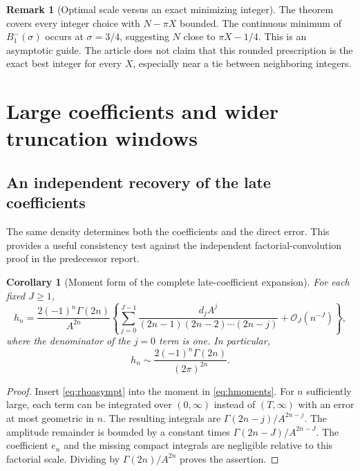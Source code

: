 \documentclass[11pt,a4paper]{article}
\newtheorem{corollary}[corollary]{Corollary}
\theoremstyle{definition}
\newtheorem{remark}[remark]{Remark}
\numberwithin{equation}{section}
\newcommand{\Oh}{\mathcal O}
\begin{document}
\begin{remark}[Optimal scale versus an exact minimizing integer]
The theorem covers every integer choice with $N-\pi X$ bounded. The
continuous minimum of $B_1^-(\sigma)$ occurs at $\sigma=3/4$, suggesting
$N$ close to $\pi X-1/4$. This is an asymptotic guide. The article does
not claim that this rounded prescription is the exact best integer for
every $X$, especially near a tie between neighboring integers.
\end{remark}

\section{Large coefficients and wider truncation windows}
\label{sec:windows}

\subsection{An independent recovery of the late coefficients}
The same density determines both the coefficients and the direct error.
This provides a useful consistency test against the independent
factorial-convolution proof in the predecessor report.

\begin{corollary}[Moment form of the complete late-coefficient expansion]
\label{cor:late}
For each fixed $J\ge1$,
\begin{equation}
 h_n=\frac{2(-1)^n\Gamma(2n)}{A^{2n}}
 \left\{\sum_{j=0}^{J-1}
 \frac{d_jA^j}{(2n-1)(2n-2)\cdots(2n-j)}+\Oh_J(n^{-J})\right\},
 \label{eq:late}
\end{equation}
where the denominator of the $j=0$ term is one. In particular,
\begin{equation}
 h_n\sim\frac{2(-1)^n\Gamma(2n)}{(2\pi)^{2n}}.
 \label{eq:lateleading}
\end{equation}
\end{corollary}
\begin{proof}
Insert \eqref{eq:rhoasympt} into the moment in \eqref{eq:hmoments}.
For $n$ sufficiently large, each term can be integrated over $(0,\infty)$
instead of $(T,\infty)$ with an error at most geometric in $n$.
The resulting integrals are
$\Gamma(2n-j)/A^{2n-j}$. The amplitude remainder is bounded by a constant
times $\Gamma(2n-J)/A^{2n-J}$. The coefficient $e_n$ and the missing
compact integrals are negligible relative to this factorial scale.
Dividing by $\Gamma(2n)/A^{2n}$ proves the assertion.
\end{proof}
\end{document}
